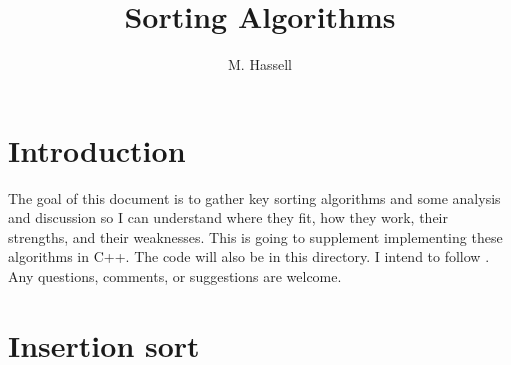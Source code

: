 \documentclass[12pt,english]{article}
\title{Sorting Algorithms}
\author{M. Hassell}
\begin{document}
\maketitle

\section{Introduction}

The goal of this document is to gather key sorting algorithms and some analysis and discussion so I can understand where they fit, how they work, their strengths, and their weaknesses.  This is going to supplement implementing these algorithms in C++.  The code will also be in this directory.  I intend to follow \cite{CoStRiLe:2001}. Any questions, comments, or suggestions are welcome.

\section{Insertion sort}

{}

\end{document}
